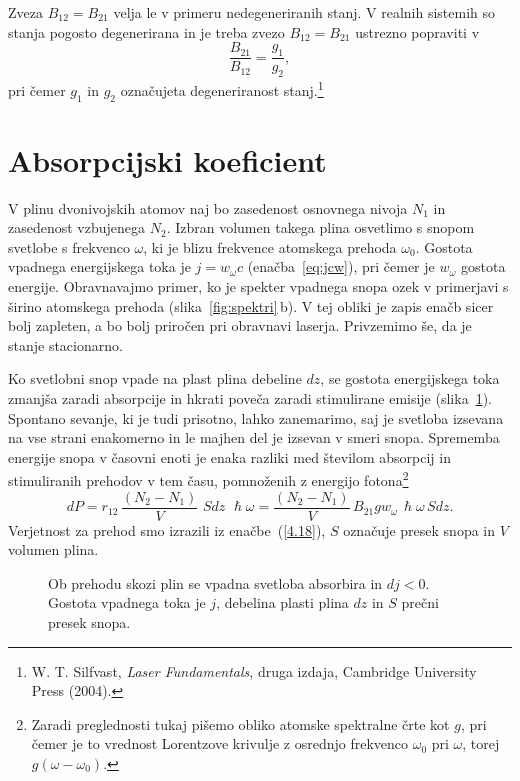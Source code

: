 \begin{remark}
 Zveza $B_{12}=B_{21}$ velja le v primeru nedegeneriranih stanj. V realnih sistemih
 so stanja pogosto degenerirana in je treba zvezo $B_{12}=B_{21}$ ustrezno popraviti v
\begin{equation}
\frac{B_{21}}{B_{12}} = \frac{g_1}{g_2},
\label{eq:ABdeg}
\end{equation}
pri čemer $g_{1}$ in $g_2$ označujeta degeneriranost 
stanj.\footnote{W. T. Silfvast, {\it Laser Fundamentals}, druga izdaja, Cambridge University Press (2004).}
\end{remark}

\section{Absorpcijski koeficient}
V plinu dvonivojskih atomov naj bo zasedenost osnovnega nivoja $N_1$ in zasedenost vzbujenega
$N_2$. Izbran volumen takega plina osvetlimo s snopom svetlobe s frekvenco
$\omega$, ki je blizu frekvence atomskega prehoda $\omega_{0}$. Gostota
vpadnega energijskega toka je $j=w_{\omega}c$ (enačba~\ref{eq:jcw}), 
pri čemer je $w_{\omega}$ gostota energije. Obravnavajmo primer, ko je 
spekter vpadnega snopa ozek v primerjavi s širino atomskega prehoda
(slika~\ref{fig:spektri}\,b). V tej obliki je zapis enačb sicer bolj zapleten,
a bo bolj priročen pri obravnavi laserja. Privzemimo še, da
je stanje stacionarno. 

Ko svetlobni snop vpade na plast plina debeline $dz$, se gostota
energijskega toka zmanjša zaradi absorpcije in hkrati poveča zaradi 
stimulirane emisije (slika~\ref{fig:abs}). 
Spontano sevanje, ki je tudi prisotno, lahko zanemarimo, saj
je svetloba izsevana na vse strani enakomerno in le majhen del je izsevan v smeri snopa.
Sprememba energije snopa v časovni enoti je enaka razliki med 
številom absorpcij in stimuliranih prehodov v tem času, pomnoženih z 
energijo fotona\footnote{Zaradi preglednosti tukaj pišemo obliko atomske spektralne črte kot $g$, 
pri čemer je to vrednost Lorentzove krivulje z osrednjo frekvenco $\omega_0$ pri $\omega$, 
torej $g(\omega-\omega_0)$.}
\begin{equation}
dP=r_{12}\,\frac{(N_{2}-N_{1})}{V}\,\,S dz\, \, \hslash\omega = 
\frac{(N_{2}-N_{1})}{V}\,B_{21}g w_{\omega} \, \hslash\omega \,S dz.
\label{4.28}
\end{equation}
Verjetnost za prehod smo izrazili iz enačbe~(\ref{4.18}),
$S$ označuje presek snopa in $V$ volumen plina. 
\begin{figure}[h]
\centering
\def\svgwidth{70truemm} 

\caption{Ob prehodu skozi plin se vpadna svetloba absorbira in $dj < 0$. Gostota vpadnega
toka je $j$, debelina plasti plina $dz$ in $S$ prečni presek snopa.}
\label{fig:abs}
\end{figure}

